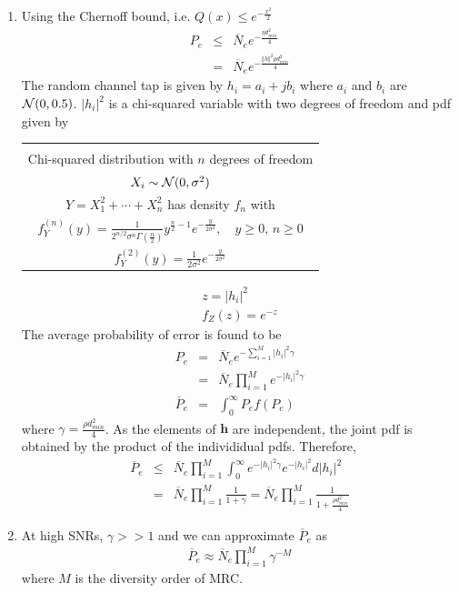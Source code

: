 \documentclass[12pt]{article}
\begin{document}
\begin{enumerate}
\item
Using the Chernoff bound, i.e. $Q(x) \le e^{-\frac{x^2}{2}}$
\begin{eqnarray*}
P_e & \le & {\overline N_e} e^{- \frac{\eta d_{min}^2}{4}} \\
    & = & {\overline N_e} e^{- \frac{\Vert h\Vert^2 \rho d_{min}^2}{4}}
\end{eqnarray*}
The random channel tap is given by $h_i = a_i + jb_i$ where $a_i$ and $b_i$ are ${\cal N} (0, 0.5)$. $|h_i|^2$ is a chi-squared variable with two degrees of freedom and pdf given by
\vspace{2mm}
\begin{center}
\begin{tabular}{|c|}
\hline \\[-3mm]
Chi-squared distribution with $n$ degrees of freedom \\
$X_i  \sim  {\cal N} (0, \sigma^2)$ \\[1mm]
$Y= X_1^2 + \cdots + X_n^2 $ has density $ f_n$ with\\[1mm]
$f_Y^{(n)}(y) = \frac{1}{2^{n/2} \sigma ^n \Gamma (\frac{n}{2})} y^{\frac{n}{2}-1}e^{-\frac{y}{2 \sigma^2}}, \quad  y \ge 0, \, n \ge 0$\\[1mm]
$f_Y^{(2)}(y) = \frac{1}{2 \sigma^2} e^{- \frac{y}{2 \sigma^2}}$ \\[2mm]
\hline
\end{tabular}
\end{center}
\begin{eqnarray*}
z = |h_i| ^2 \\
f_Z(z) = e^{-z}
\end{eqnarray*}
The average probability of error is found to be
\begin{eqnarray*}
P_e & = & {\overline N_e} e^{- \sum_{i=1}^M |h_i|^2 \gamma}\\
 & = & {\overline N_e} \prod_{i=1}^M e^{ -|h_i|^2 \gamma}\\
{\overline P_e} & =&  \int_0^\infty P_e f(P_e)
\end{eqnarray*}
where $\gamma = \frac{\rho d_{min}^2}{4} $. As the elements of $\mathbf h$ are independent, the joint pdf is obtained by the product of the individidual pdfs. Therefore,
\begin{eqnarray*}
{\overline P_e}  &\le & {\overline N_e} \prod_{i=1}^M \int_0^\infty e^{-|h_i|^2 \gamma} e^{- |h_i|^2} d |h_i|^2\\
& = &  {\overline N_e} \prod_{i=1}^M \frac{1} {1 + \gamma}=   {\overline N_e} \prod_{i=1}^M \frac{1} {1 +  \frac{\rho d_{min}^2}{4} }
\end{eqnarray*}

\item
At high SNRs, $\gamma >> 1$ and we can approximate ${\overline P_e}$ as
\begin{eqnarray*}
{\overline P_e} \approx {\overline N_e} \prod_{i=1}^M \gamma^{-M}
\end{eqnarray*}
where $M$ is the diversity order of MRC.
\end{enumerate}
\end{document}
